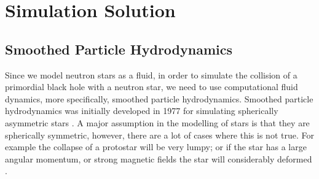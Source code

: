 %
%
% 
%
%
%
%
%

\chapter{Simulation Solution}

\section{Smoothed Particle Hydrodynamics}

Since we model neutron stars as a fluid, in order to simulate the collision of a primordial black hole with a neutron star, we need to use computational fluid dynamics, more specifically, smoothed particle hydrodynamics. Smoothed particle hydrodynamics was initially developed in 1977 for simulating spherically asymmetric stars \cite{origsph}. A major assumption in the modelling of stars is that they are spherically symmetric, however, there are a lot of cases where this is not true. For example the collapse of a protostar will be very lumpy; or if the star has a large angular momentum, or strong magnetic fields the star will considerably deformed \cite{origsph}. \\

